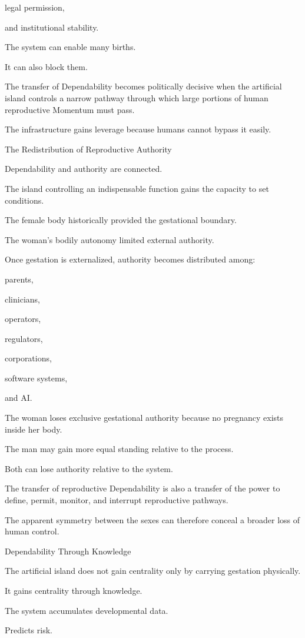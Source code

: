 legal permission,

and institutional stability.

The system can enable many births.

It can also block them.

The transfer of Dependability becomes politically decisive when the artificial island controls a narrow pathway through which large portions of human reproductive Momentum must pass.

The infrastructure gains leverage because humans cannot bypass it easily.

The Redistribution of Reproductive Authority

Dependability and authority are connected.

The island controlling an indispensable function gains the capacity to set conditions.

The female body historically provided the gestational boundary.

The woman’s bodily autonomy limited external authority.

Once gestation is externalized, authority becomes distributed among:

parents,

clinicians,

operators,

regulators,

corporations,

software systems,

and AI.

The woman loses exclusive gestational authority because no pregnancy exists inside her body.

The man may gain more equal standing relative to the process.

Both can lose authority relative to the system.

The transfer of reproductive Dependability is also a transfer of the power to define, permit, monitor, and interrupt reproductive pathways.

The apparent symmetry between the sexes can therefore conceal a broader loss of human control.

Dependability Through Knowledge

The artificial island does not gain centrality only by carrying gestation physically.

It gains centrality through knowledge.

The system accumulates developmental data.

Predicts risk.

